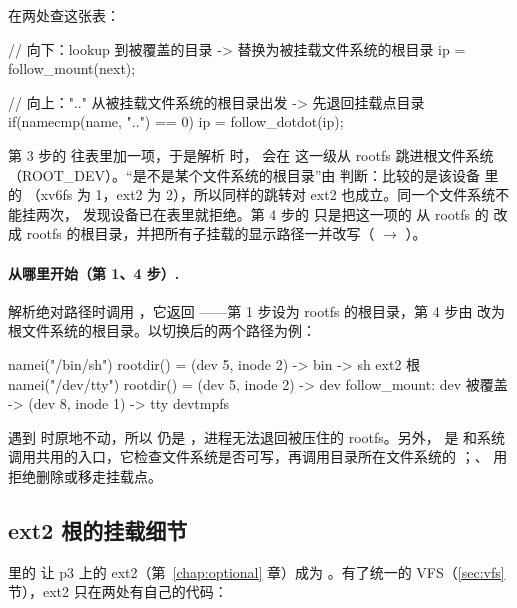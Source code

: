  在两处查这张表：

\begin{ccode}
// 向下：lookup 到被覆盖的目录 -> 替换为被挂载文件系统的根目录
ip = follow_mount(next);

// 向上：".." 从被挂载文件系统的根目录出发 -> 先退回挂载点目录
if(namecmp(name, "..") == 0)
    ip = follow_dotdot(ip);
\end{ccode}

第 3 步的  往表里加一项，于是解析  时， 会在  这一级从 rootfs 跳进根文件系统（ROOT\_DEV）。“是不是某个文件系统的根目录”由  判断：比较的是该设备  里的 （xv6fs 为 1，ext2 为 2），所以同样的跳转对 ext2 也成立。同一个文件系统不能挂两次， 发现设备已在表里就拒绝。第 4 步的  只是把这一项的  从 rootfs 的  改成 rootfs 的根目录，并把所有子挂载的显示路径一并改写（ $\to$ ）。

\paragraph{\code{/} 从哪里开始（第 1、4 步）.}  解析绝对路径时调用 ，它返回 ——第 1 步设为 rootfs 的根目录，第 4 步由  改为根文件系统的根目录。以切换后的两个路径为例：

\begin{txtcode}
namei("/bin/sh")    rootdir() = (dev 5, inode 2)  -> bin -> sh        ext2 根
namei("/dev/tty")   rootdir() = (dev 5, inode 2)  -> dev
                    follow_mount: dev 被覆盖 -> (dev 8, inode 1) -> tty  devtmpfs
\end{txtcode}

 遇到  时原地不动，所以  仍是 \code{/}，进程无法退回被压住的 rootfs。另外， 是  和系统调用共用的入口，它检查文件系统是否可写，再调用目录所在文件系统的 ；、 用  拒绝删除或移走挂载点。

\subsection{ext2 根的挂载细节}
\label{sec:ext2-root}

 里的  让 p3 上的 ext2（第~\ref{chap:optional} 章）成为 \code{/}。有了统一的 VFS（\ref{sec:vfs} 节），ext2 只在两处有自己的代码：

